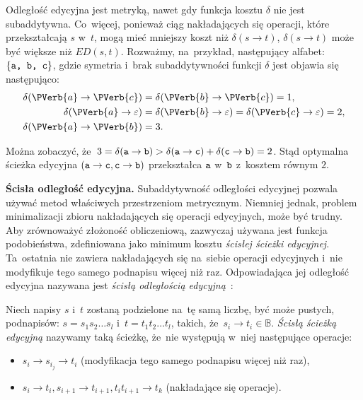 \documentclass{praca1}
\begin{document}
Odległość edycyjna jest metryką, nawet gdy funkcja kosztu $\delta$ nie jest subaddytywna. Co~więcej, ponieważ ciąg nakładających się operacji, które przekształcają $s$ w~$t$, mogą mieć mniejszy koszt niż $\delta(s \rightarrow t)$, $\delta(s \rightarrow t)$ może być większe niż $ED(s,t)$. Rozważmy, na~przykład, następujący alfabet: $\{\verb|a, b, c|\}$, gdzie symetria i~brak subaddytywności funkcji $\delta$ jest objawia się następująco:
\begin{align*}
\delta(\PVerb{a} \rightarrow \PVerb{c}) &= \delta(\PVerb{b} \rightarrow \PVerb{c}) = 1, \\
\delta(\PVerb{a} \rightarrow \varepsilon) &= \delta(\PVerb{b} \rightarrow \varepsilon) = \delta(\PVerb{c} \rightarrow \varepsilon) = 2, \\
\delta(\PVerb{a} \rightarrow \PVerb{b}) &= 3.
\end{align*}

Można zobaczyć, że~$3 = \delta(\verb|a| \rightarrow \verb|b|) > \delta(\verb|a| \rightarrow \verb|c|) + \delta(\verb|c| \rightarrow \verb|b|) = 2$. Stąd optymalna ścieżka edycyjna $(\verb|a| \rightarrow \verb|c|, \verb|c| \rightarrow \verb|b|)$ przekształca $\verb|a|$ w~$\verb|b|$ z~kosztem równym $2$.

\textbf{Ścisła odległość edycyjna.} Subaddytywność odległości edycyjnej pozwala używać metod właściwych przestrzeniom metrycznym. Niemniej jednak, problem minimalizacji zbioru nakładających się operacji edycyjnych, może być trudny. Aby zrównoważyć złożoność obliczeniową, zazwyczaj używana jest funkcja podobieństwa, zdefiniowana jako minimum kosztu \emph{ścisłej ścieżki edycyjnej}. Ta~ostatnia nie zawiera nakładających się na~siebie operacji edycyjnych i~nie modyfikuje tego samego podnapisu więcej niż raz. Odpowiadająca jej odległość edycyjna nazywana jest \emph{ścisłą odległością edycyjną}~\cite{Boytsov2011:indexingmethods}:

\begin{definition}
Niech napisy $s$ i~$t$ zostaną podzielone na~tę samą liczbę, być może pustych, podnapisów: $s = s_1 s_2 \ldots s_l$ i~$t = t_1 t_2 \ldots t_l$, takich, że~$s_i \rightarrow t_i \in \mathbb{B}$. \emph{Ścisłą ścieżką edycyjną} nazywamy taką ścieżkę, że~nie występują w~niej następujące operacje:
\begin{itemize}
\item $s_i \rightarrow s_{i_j} \rightarrow t_i$ (modyfikacja tego samego podnapisu więcej niż raz),
\item $s_i \rightarrow t_i, s_{i+1} \rightarrow t_{i+1}, t_it_{i+1} \rightarrow t_k$ (nakładające się operacje).
\end{itemize}
\end{definition}
\end{document}

